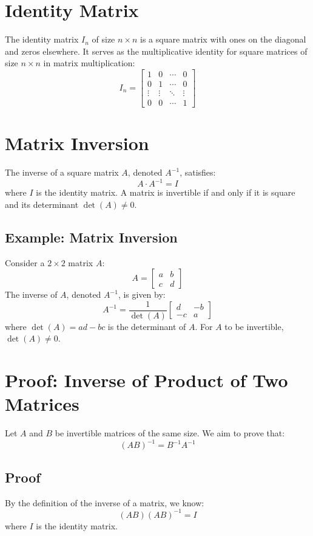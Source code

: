 \documentclass{article}
\begin{document}
\section{Identity Matrix}
The identity matrix \( I_n \) of size \( n \times n \) is a square matrix with ones on the diagonal and zeros elsewhere. It serves as the multiplicative identity for square matrices of size \( n \times n \) in matrix multiplication:
\[
I_n = \begin{bmatrix}
1 & 0 & \cdots & 0 \\
0 & 1 & \cdots & 0 \\
\vdots & \vdots & \ddots & \vdots \\
0 & 0 & \cdots & 1
\end{bmatrix}
\]

\section{Matrix Inversion}
The inverse of a square matrix \( A \), denoted \( A^{-1} \), satisfies:
\[
A \cdot A^{-1} = I
\]
where \( I \) is the identity matrix. A matrix is invertible if and only if it is square and its determinant \( \det(A) \neq 0 \).

\subsection{Example: Matrix Inversion}
Consider a \( 2 \times 2 \) matrix \( A \):
\[
A = \begin{bmatrix}
a & b \\
c & d
\end{bmatrix}
\]
The inverse of \( A \), denoted \( A^{-1} \), is given by:
\[
A^{-1} = \frac{1}{\det(A)} \begin{bmatrix}
d & -b \\
-c & a
\end{bmatrix}
\]
where \( \det(A) = ad - bc \) is the determinant of \( A \). For \( A \) to be invertible, \( \det(A) \neq 0 \).

\section{Proof: Inverse of Product of Two Matrices}
Let \( A \) and \( B \) be invertible matrices of the same size. We aim to prove that:
\[
(AB)^{-1} = B^{-1}A^{-1}
\]

\subsection*{Proof}
By the definition of the inverse of a matrix, we know:
\[
(AB)(AB)^{-1} = I
\]
where \( I \) is the identity matrix.
\end{document}
